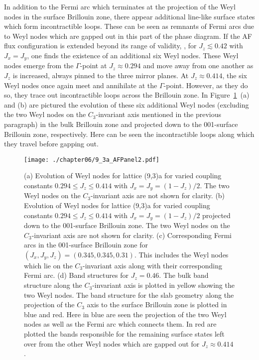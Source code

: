In addition to the Fermi arc which terminates at the projection of the Weyl nodes in the surface Brillouin zone, there appear additional line-like surface states which form incontractible loops.
These can be seen as remnants of Fermi arcs due to Weyl nodes which are gapped out in this part of the phase diagram.
If the AF flux configuration is extended beyond its range of validity, \ie, for $J_z \lesssim 0.42$ with $J_x = J_y$, one finds the existence of an additional six Weyl nodes.
These Weyl nodes emerge from the $\Gamma$-point at $J_z \approx 0.294$ and move away from one another as $J_z$ is increased, always pinned to the three mirror planes.
At $J_z \approx 0.414$, the six Weyl nodes once again meet and annihilate at the $\Gamma$-point.
However, as they do so, they trace out incontractible loops across the Brillouin zone.
In Figure~\ref{fig:chapter06_AFPanel2}~(a) and (b) are pictured the evolution of these six additional Weyl nodes (excluding the two Weyl nodes on the $C_3$-invariant axis mentioned in the previous paragraph) in the bulk Brillouin zone and projected down to the 001-surface Brillouin zone, respectively.
Here can be seen the incontractible loops along which they travel before gapping out.
%
\begin{figure}[tb]
	\centering
	\texttt{[image: ./chapter06/9\_3a\_AFPanel2.pdf]}
	\caption{
		(a) Evolution of Weyl nodes for lattice (9,3)a for varied coupling constants $0.294 \leq J_z \leq 0.414$ with $J_x = J_y = (1 - J_z)/2$.
		The two Weyl nodes on the $C_3$-invariant axis are not shown for clarity.
		(b) Evolution of Weyl nodes for lattice (9,3)a for varied coupling constants $0.294 \leq J_z \leq 0.414$ with $J_x = J_y = (1 - J_z)/2$ projected down to the 001-surface Brillouin zone.
		The two Weyl nodes on the $C_3$-invariant axis are not shown for clarity.
		(c) Corresponding Fermi arcs in the 001-surface Brillouin zone for $(J_x, J_y, J_z) = (0.345, 0.345, 0.31)$.
		This includes the Weyl nodes which lie on the $C_3$-invariant axis along with their corresponding Fermi arc.
		(d) Band structures for $J_z = 0.46$.
		The bulk band structure along the $C_3$-invariant axis is plotted in yellow showing the two Weyl nodes.
		The band structure for the slab geometry along the projection of the $C_3$ axis to the surface Brillouin zone is plotted in blue and red.
		Here in blue are seen the projection of the two Weyl nodes as well as the Fermi arc which connects them.
		In red are plotted the bands responsible for the remaining surface states left over from the other Weyl nodes which are gapped out for $J_z \approx 0.414$.
	}
	\label{fig:chapter06_AFPanel2}
\end{figure}
%

